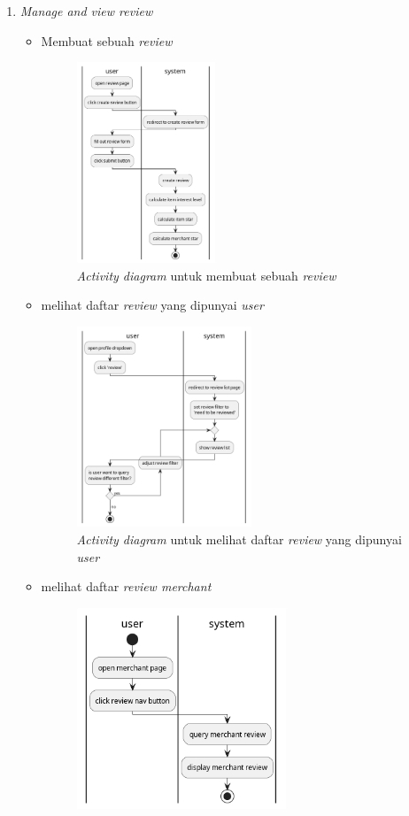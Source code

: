\documentclass[a4paper]{article}
\begin{document}
\begin{enumerate}
\begin{enumerate}
        \item \textit{Manage and view review}
        \begin{itemize}
            \item Membuat sebuah \textit{review}
            \begin{figure}[h]
                \centering
                \includegraphics*[height=6cm]{./diagram/activity diagram/16. review/create review/create review.png}
                \caption{\textit{Activity diagram} untuk membuat sebuah \textit{review}}
            \end{figure}
            \item melihat daftar \textit{review} yang dipunyai \textit{user}
            \begin{figure}[h]
                \centering
                \includegraphics*[height=6cm]{./diagram/activity diagram/16. review/view user review/view user review list.png}
                \caption{\textit{Activity diagram} untuk melihat daftar \textit{review} yang dipunyai \textit{user}}
            \end{figure}
            \newpage
            \item melihat daftar \textit{review merchant} 
            \begin{figure}[h]
                \centering
                \includegraphics*[height=6cm]{./diagram/activity diagram/16. review/view merchant review/merchant review.png}

\end{figure}
\end{itemize}
\end{enumerate}
\end{enumerate}
\end{document}
